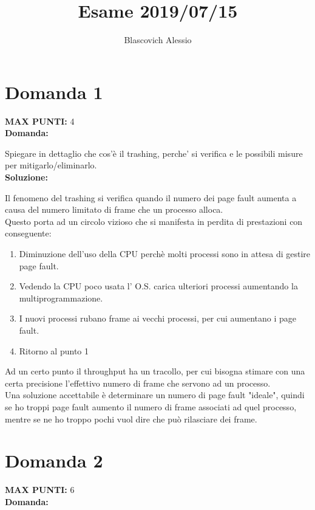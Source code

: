 \documentclass{article}
\title{Esame 2019/07/15}
\author{Blascovich Alessio}
\date{}
\begin{document}
    \maketitle
    \section*{Domanda 1}
    \textbf{MAX PUNTI:} 4\\
    \textbf{Domanda:}


    Spiegare in dettaglio che cos'è il trashing, perche' si verifica e le possibili misure per mitigarlo/eliminarlo.\\
    \textbf{Soluzione:}


    Il fenomeno del trashing si verifica quando il numero dei page fault aumenta a causa del numero limitato di frame che un processo alloca.\\
    Questo porta ad un circolo vizioso che si manifesta in perdita di prestazioni con conseguente:
    \begin{enumerate}
        \item Diminuzione dell'uso della CPU perchè molti processi sono in attesa di gestire page fault.
        \item Vedendo la CPU poco usata l' O.S. carica ulteriori processi aumentando la multiprogrammazione.
        \item I nuovi processi rubano frame ai vecchi processi, per cui aumentano i page fault.
        \item Ritorno al punto 1
    \end{enumerate}
    Ad un certo punto il throughput ha un tracollo, per cui bisogna stimare con una certa precisione l'effettivo numero di frame che servono ad un processo.\\
    Una soluzione accettabile è determinare un numero di page fault "ideale", quindi se ho troppi page fault aumento il numero di frame associati ad quel processo, mentre se ne ho troppo pochi vuol dire che può rilasciare dei frame.
    \section*{Domanda 2}
    \textbf{MAX PUNTI:} 6\\
    \textbf{Domanda:}
\end{document}
